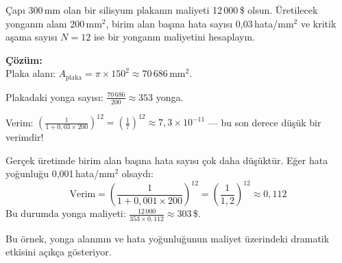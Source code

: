 \begin{ornek}[1.3]
Çapı 300\,mm olan bir silisyum plakanın maliyeti 12\,000\,\$ olsun. Üretilecek yonganın alanı 200\,mm$^2$, birim alan başına hata sayısı 0{,}03\,hata/mm$^2$ ve kritik aşama sayısı $N=12$ ise bir yonganın maliyetini hesaplayın.

\textbf{Çözüm:}\\
Plaka alanı: $A_\text{plaka} = \pi \times 150^2 \approx 70\,686$\,mm$^2$.

Plakadaki yonga sayısı: $\displaystyle\frac{70\,686}{200} \approx 353$ yonga.

Verim: $\displaystyle\left(\frac{1}{1 + 0{,}03 \times 200}\right)^{12} = \left(\frac{1}{7}\right)^{12} \approx 7{,}3 \times 10^{-11}$ --- bu son derece düşük bir verimdir!

Gerçek üretimde birim alan başına hata sayısı çok daha düşüktür. Eğer hata yoğunluğu 0{,}001\,hata/mm$^2$ olsaydı:
\[
\text{Verim} = \left(\frac{1}{1 + 0{,}001 \times 200}\right)^{12} = \left(\frac{1}{1{,}2}\right)^{12} \approx 0{,}112
\]
Bu durumda yonga maliyeti: $\displaystyle\frac{12\,000}{353 \times 0{,}112} \approx 303$\,\$.

Bu örnek, yonga alanının ve hata yoğunluğunun maliyet üzerindeki dramatik etkisini açıkça gösteriyor.
\end{ornek}

